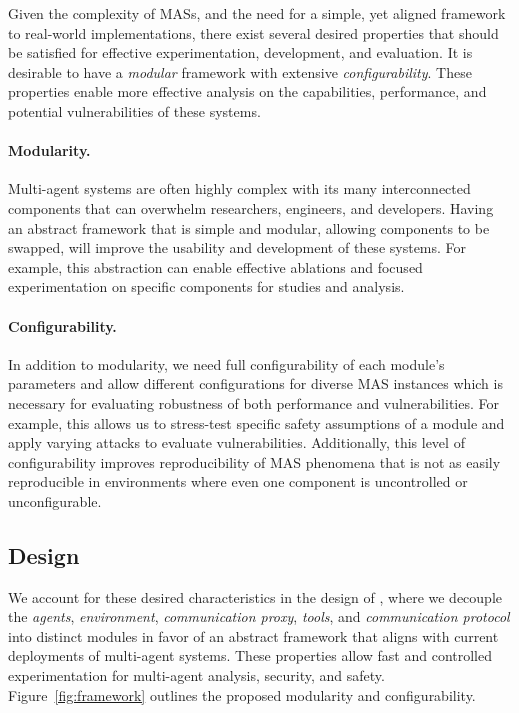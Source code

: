 Given the complexity of MASs, and the need for a simple, yet aligned framework to real-world implementations, there exist several desired properties that should be satisfied for effective experimentation, development, and evaluation. It is desirable to have a \textit{modular} framework with extensive \textit{configurability}. These properties enable more effective analysis on the capabilities, performance, and potential vulnerabilities of these systems. 

\paragraph{Modularity.}
Multi-agent systems are often highly complex with its many interconnected components that can overwhelm researchers, engineers, and developers. Having an abstract framework that is simple and modular, allowing components to be swapped, will improve the usability and development of these systems. For example, this abstraction can enable effective ablations and focused experimentation on specific components for studies and analysis.


\paragraph{Configurability.} In addition to modularity, we need full configurability of each module's parameters and allow different configurations for diverse MAS instances which is necessary for evaluating robustness of both performance and vulnerabilities. For example, this allows us to stress-test specific safety assumptions of a module and apply varying attacks to evaluate vulnerabilities. Additionally, this level of configurability improves reproducibility of MAS phenomena that is not as easily reproducible in environments where even one component is uncontrolled or unconfigurable.

\subsection{Design}

We account for these desired characteristics in the design of \sys, where we  decouple the \emph{agents}, \emph{environment}, \emph{communication proxy}, \emph{tools}, and \emph{communication protocol} into distinct modules in favor of an abstract framework that aligns with current deployments of multi-agent systems. These properties allow fast and controlled experimentation for multi-agent analysis, security, and safety. Figure~\ref{fig:framework} outlines the proposed modularity and configurability.



